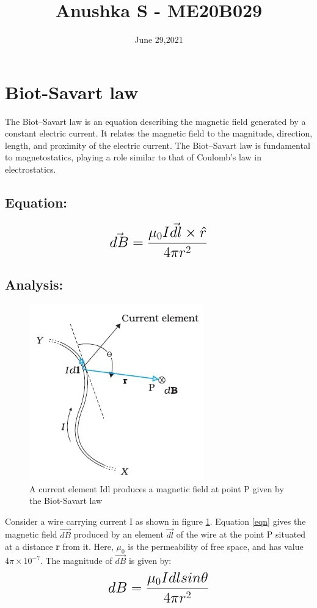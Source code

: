 \documentclass[a4paper,12pt]{article}
\title{Anushka S - ME20B029}
\author{}
\date{June 29,2021}
\begin{document}
\maketitle
\section{Biot-Savart law}
The Biot–Savart law is an equation describing the magnetic field generated by a constant electric current. It relates the magnetic field to the magnitude, direction, length, and proximity of the electric current. The Biot–Savart law is fundamental to magnetostatics, playing a role similar to that of Coulomb's law in electrostatics.\cite{webref1}
\subsection{Equation:}
\begin{equation}
    {\LARGE{\textbf{$\vec{dB}=\frac{\mu_{0} I\vec{dl}\times\hat{r}}{4\pi r^2}$}}}
    \label{eqn}
\end{equation}
\subsection{Analysis:}
\begin{figure}[h]
	{\begin{center}
		\includegraphics[scale=0.5]{ME20B029.jpg}
	\end{center}}
	\caption{A current element Idl produces a magnetic field at point P given by the Biot-Savart law \cite{picture}}
	\label{fig}
\end{figure}
Consider a wire carrying current I as shown in figure \ref{fig}. Equation \ref{eqn} gives the magnetic field {$\vec{dB}$} produced by an element {$\vec{dl}$} 
of the wire at the point P situated at a distance {\textbf{r}} from it. Here, {$\mu_{0}$} is the permeability of free space, and has value {$4\pi\times10^{-7}$}.\cite{webref2}
The magnitude of {$\vec{dB}$} is given by: 
\begin{equation}
{\LARGE{\textbf{${dB}=\frac{\mu_{0} Idlsin\theta}{4\pi r^2}$}}}
\end{equation}
\end{document}
